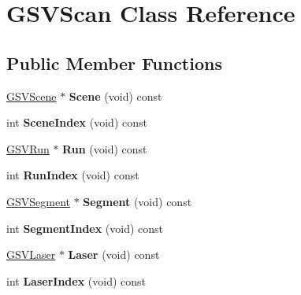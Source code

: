 \hypertarget{class_g_s_v_scan}{}\section{G\+S\+V\+Scan Class Reference}
\label{class_g_s_v_scan}
\subsection*{Public Member Functions}
\begin{DoxyCompactItemize}
\item 
\hyperlink{class_g_s_v_scene}{G\+S\+V\+Scene} $\ast$ {\bfseries Scene} (void) const \hypertarget{class_g_s_v_scan_abff175e1883ed8ffb0352ce775fb3be2}{}\label{class_g_s_v_scan_abff175e1883ed8ffb0352ce775fb3be2}

\item 
int {\bfseries Scene\+Index} (void) const \hypertarget{class_g_s_v_scan_a02c60e070a71cbbc725d5627f4feb384}{}\label{class_g_s_v_scan_a02c60e070a71cbbc725d5627f4feb384}

\item 
\hyperlink{class_g_s_v_run}{G\+S\+V\+Run} $\ast$ {\bfseries Run} (void) const \hypertarget{class_g_s_v_scan_a7a9960e8fc69f20514c13b74402d3516}{}\label{class_g_s_v_scan_a7a9960e8fc69f20514c13b74402d3516}

\item 
int {\bfseries Run\+Index} (void) const \hypertarget{class_g_s_v_scan_ab0d9d95aabbe4e093ae479103ef07fc3}{}\label{class_g_s_v_scan_ab0d9d95aabbe4e093ae479103ef07fc3}

\item 
\hyperlink{class_g_s_v_segment}{G\+S\+V\+Segment} $\ast$ {\bfseries Segment} (void) const \hypertarget{class_g_s_v_scan_a258c8b1ce3ff5a4f47a582a4658ff9ea}{}\label{class_g_s_v_scan_a258c8b1ce3ff5a4f47a582a4658ff9ea}

\item 
int {\bfseries Segment\+Index} (void) const \hypertarget{class_g_s_v_scan_abb2a6fda464cb709b26ff6fd8db28b50}{}\label{class_g_s_v_scan_abb2a6fda464cb709b26ff6fd8db28b50}

\item 
\hyperlink{class_g_s_v_laser}{G\+S\+V\+Laser} $\ast$ {\bfseries Laser} (void) const \hypertarget{class_g_s_v_scan_ae0fdd1eb393a76bd230bdba75da04740}{}\label{class_g_s_v_scan_ae0fdd1eb393a76bd230bdba75da04740}

\item 
int {\bfseries Laser\+Index} (void) const \hypertarget{class_g_s_v_scan_a2c6792f54642e253087c0c03bd21642e}{}\label{class_g_s_v_scan_a2c6792f54642e253087c0c03bd21642e}


\end{DoxyCompactItemize}
